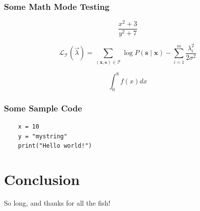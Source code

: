 \documentclass[aspectratio=169]{beamer}
\begin{document}
\begin{frame}
  \frametitle{Some Math Mode Testing}
  $$\frac{x^2+3}{y^2+7}$$

  \[
    \mathcal L_{\mathcal T}(\vec{\lambda})
    = \sum_{(\mathbf{x},\mathbf{s})\in \mathcal T}
       \log P(\mathbf{s}\mid\mathbf{x}) - \sum_{i=1}^m
       \frac{\lambda_i^2}{2\sigma^2}
  \]

  $$\int_0^8 f(x) dx$$
\end{frame}

\begin{frame}[fragile]
  \frametitle{Some Sample Code}

  \begin{verbatim}
    x = 10
    y = "mystring"
    print("Hello world!")
  \end{verbatim}

\end{frame}


\section{Conclusion}
\frame{\sectionpage}

\begin{frame}
  \begin{center}
    {\color{sigpwny@maingreen} So long, and thanks for all the fish!}
  \end{center}
\end{frame}
\end{document}
